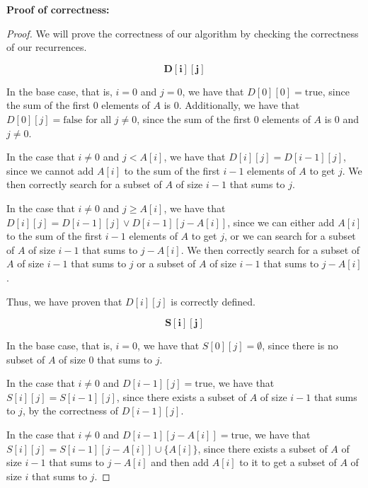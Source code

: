 \documentclass[11pt]{article}
\begin{document}
\textbf{Proof of correctness: }

\begin{proof}
    We will prove the correctness of our algorithm by checking the correctness of 
    our recurrences. 

    \begin{equation*}
        \mathbf{D[i][j]}
    \end{equation*}

    In the base case, that is, $i = 0$ and $j = 0$, we have that $D[0][0] = \text{true}$,
    since the sum of the first $0$ elements of $A$ is $0$. Additionally, we have that
    $D[0][j] = \text{false}$ for all $j \neq 0$, since the sum of the first $0$ elements
    of $A$ is $0$ and $j \neq 0$.

    In the case that $i \neq 0$ and $j < A[i]$, we have that $D[i][j] = D[i-1][j]$,
    since we cannot add $A[i]$ to the sum of the first $i-1$ elements of $A$ to get 
    $j$. We then correctly search for a subset of $A$ of size $i-1$ that sums to $j$.

    In the case that $i \neq 0$ and $j \geq A[i]$, we have that $D[i][j] = D[i-1][j] \lor D[i-1][j-A[i]]$,
    since we can either add $A[i]$ to the sum of the first $i-1$ elements of $A$ to get
    $j$, or we can search for a subset of $A$ of size $i-1$ that sums to $j - A[i]$. We then
    correctly search for a subset of $A$ of size $i-1$ that sums to $j$ or a subset of
    $A$ of size $i-1$ that sums to $j-A[i]$.

    Thus, we have proven that $D[i][j]$ is correctly defined.

    \begin{equation*}
        \mathbf{S[i][j]}
    \end{equation*}

    In the base case, that is, $i = 0$, we have that $S[0][j] = \emptyset$, since
    there is no subset of $A$ of size $0$ that sums to $j$. 

    In the case that $i \neq 0$ and $D[i-1][j] = \text{true}$, we have that $S[i][j] = S[i-1][j]$,
    since there exists a subset of $A$ of size $i-1$ that sums to $j$, by the 
    correctness of $D[i-1][j]$.

    In the case that $i \neq 0$ and $D[i-1][j-A[i]] = \text{true}$, we have that $S[i][j] = S[i-1][j-A[i]] \cup \{A[i]\}$,
    since there exists a subset of $A$ of size $i-1$ that sums to $j-A[i]$ and then
    add $A[i]$ to it to get a subset of $A$ of size $i$ that sums to $j$. 


\end{proof}
\end{document}
